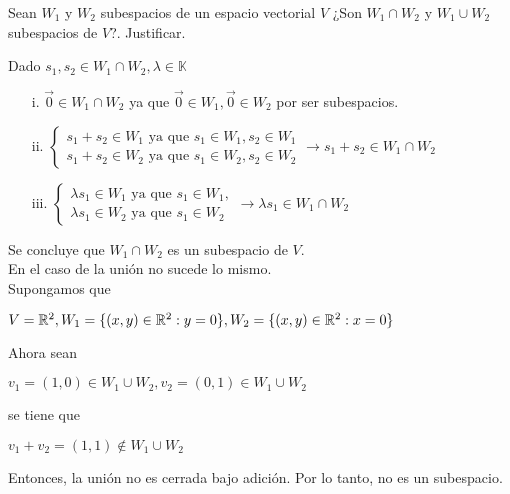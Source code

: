 \item Sean $W_1$ y $W_2$ subespacios de un espacio vectorial $V$ ¿Son $W_1\cap W_2$ y $W_1\cup W_2$ subespacios de $V$?. Justificar.
    \begin{mdframed}[style=s]
        Dado $s_1,s_2\in W_1\cap W_2, \lambda\in\mathbb{K}$
        \begin{enumerate}
            \item[i.] $\vec{0}\in W_1\cap W_2$ ya que $\vec{0}\in W_1, \vec{0}\in W_2$ por ser subespacios.
            \item[ii.] $\begin{cases}
                    s_1+s_2\in W_1 \text{ ya que } s_1\in W_1,s_2\in W_1\\
                    s_1+s_2\in W_2 \text{ ya que } s_1\in W_2,s_2\in W_2
                \end{cases}\to s_1+s_2\in W_1\cap W_2$
            \item[iii.] $\begin{cases}
                    \lambda s_1\in W_1 \text{ ya que } s_1\in W_1,\\
                    \lambda s_1\in W_2 \text{ ya que } s_1\in W_2
                \end{cases}\to \lambda s_1\in W_1\cap W_2$
        \end{enumerate}
        Se concluye que $W_1\cap W_2$ es un subespacio de $V$.\\
        En el caso de la unión no sucede lo mismo.\\
        Supongamos que 
        \begin{tightcenter}
            $V=\mathbb{R}^2,W_1=\{(x,y)\in\mathbb{R}^2:y=0\},W_2=\{(x,y)\in\mathbb{R}^2:x=0\}$    
        \end{tightcenter}
        Ahora sean 
        \begin{tightcenter}
            $v_1=(1,0)\in W_1\cup W_2, v_2=(0,1)\in W_1\cup W_2$    
        \end{tightcenter}
        se tiene que 
        \begin{tightcenter}
            $v_1+v_2=(1,1)\notin W_1\cup W_2$    
        \end{tightcenter}
        Entonces, la unión no es cerrada bajo adición. Por lo tanto, no es un subespacio.
    \end{mdframed}